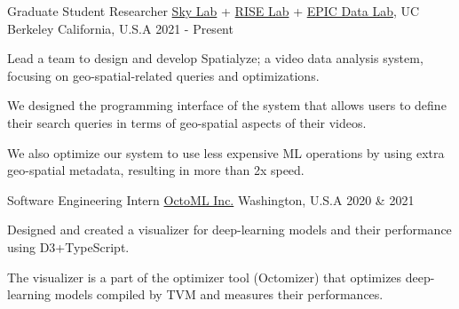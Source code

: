 

\begin{cventries}

  \cvwork
    {Graduate Student Researcher} %
    {
        \href{https://sky.cs.berkeley.edu/}{Sky Lab} +
        \href{https://rise.cs.berkeley.edu/}{RISE Lab} +
        \href{https://epic.berkeley.edu/}{EPIC Data Lab}, UC Berkeley
    } %
    {California, U.S.A} %
    {2021 - Present} %
    {
      \begin{cvitems} %
        \item{Lead a team to design and develop Spatialyze; a video data analysis system, focusing on geo-spatial-related queries and optimizations.}
        \item{We designed the programming interface of the system that allows users to define their search queries in terms of geo-spatial aspects of their videos.}
        \item{We also optimize our system to use less expensive ML operations by using extra geo-spatial metadata, resulting in more than 2x speed.}
      \end{cvitems}
    }

  \cvwork
    {Software Engineering Intern} %
    {\href{https://octoml.ai/}{OctoML Inc.}} %
    {Washington, U.S.A} %
    {2020 \& 2021} %
    {
      \begin{cvitems} %
          \item{Designed and created a visualizer for deep-learning models and their performance using D3+TypeScript.}
          \item{The visualizer is a part of the optimizer tool (Octomizer) that optimizes deep-learning models compiled by TVM and measures their performances.}
      \end{cvitems}
    }


\end{cventries}
